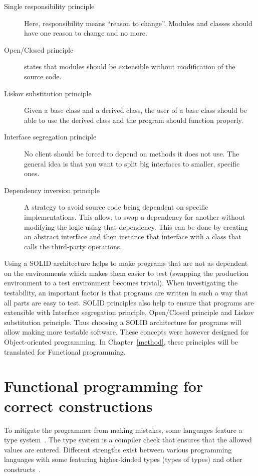 \begin{description}
    \item [Single responsibility principle] Here, responsibility means ``reason
        to change''. Modules and classes should have one reason to change and no
        more.
    \item [Open/Closed principle] states that modules should be
        extensible without modification of the source code.
    \item [Liskov substitution principle] Given a base class and a derived
        class, the user of a base class should be able to use the derived
        class and the program should function properly.
    \item [Interface segregation principle] No client should be forced to depend
        on methods it does not use. The general idea is that you want to split
        big interfaces to smaller, specific ones.
	\item [Dependency inversion principle] A strategy to avoid source code
being dependent on specific implementations.  This allow, to swap a dependency
for another without modifying the logic using that dependency. This can be done
by creating an abstract interface and then instance that interface with a class
that calls the third-party operations.
\end{description}

Using a SOLID architecture helps to make programs that are not as dependent on
the environments which makes them easier to test (swapping the production
environment to a test environment becomes trivial). When investigating the
testability, an important factor is that programs are written in such a way
that all parts are easy to test. SOLID principles also help to ensure that
programs are extensible with Interface segregation principle, Open/Closed
principle and Liskov substitution principle. Thus choosing a SOLID architecture
for programs will allow making more testable software. These concepts were
however designed for Object-oriented programming. In Chapter~\ref{method},
these principles will be translated for Functional programming. 

\section{Functional programming for correct constructions}

To mitigate the programmer from making mistakes, some languages feature a type
system~\cite{cardelli1996type}. The type system is a compiler check that
ensures that the allowed values are entered. Different strengths exist between
various programming languages with some featuring higher-kinded types (types of
types) and other constructs~\cite{moors2007towards}.

